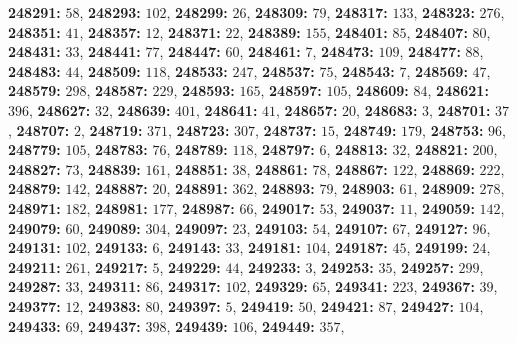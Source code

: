 \textsf{\bfseries 248291:} $58$, \textsf{\bfseries 248293:} $102$, \textsf{\bfseries 248299:} $26$, \textsf{\bfseries 248309:} $79$, \textsf{\bfseries 248317:} $133$, \textsf{\bfseries 248323:} $276$, \textsf{\bfseries 248351:} $41$, \textsf{\bfseries 248357:} $12$, \textsf{\bfseries 248371:} $22$, \textsf{\bfseries 248389:} $155$, \textsf{\bfseries 248401:} $85$, \textsf{\bfseries 248407:} $80$, \textsf{\bfseries 248431:} $33$, \textsf{\bfseries 248441:} $77$, \textsf{\bfseries 248447:} $60$, \textsf{\bfseries 248461:} $7$, \textsf{\bfseries 248473:} $109$, \textsf{\bfseries 248477:} $88$, \textsf{\bfseries 248483:} $44$, \textsf{\bfseries 248509:} $118$, \textsf{\bfseries 248533:} $247$, \textsf{\bfseries 248537:} $75$, \textsf{\bfseries 248543:} $7$, \textsf{\bfseries 248569:} $47$, \textsf{\bfseries 248579:} $298$, \textsf{\bfseries 248587:} $229$, \textsf{\bfseries 248593:} $165$, \textsf{\bfseries 248597:} $105$, \textsf{\bfseries 248609:} $84$, \textsf{\bfseries 248621:} $396$, \textsf{\bfseries 248627:} $32$, \textsf{\bfseries 248639:} $401$, \textsf{\bfseries 248641:} $41$, \textsf{\bfseries 248657:} $20$, \textsf{\bfseries 248683:} $3$, \textsf{\bfseries 248701:} $37$, \textsf{\bfseries 248707:} $2$, \textsf{\bfseries 248719:} $371$, \textsf{\bfseries 248723:} $307$, \textsf{\bfseries 248737:} $15$, \textsf{\bfseries 248749:} $179$, \textsf{\bfseries 248753:} $96$, \textsf{\bfseries 248779:} $105$, \textsf{\bfseries 248783:} $76$, \textsf{\bfseries 248789:} $118$, \textsf{\bfseries 248797:} $6$, \textsf{\bfseries 248813:} $32$, \textsf{\bfseries 248821:} $200$, \textsf{\bfseries 248827:} $73$, \textsf{\bfseries 248839:} $161$, \textsf{\bfseries 248851:} $38$, \textsf{\bfseries 248861:} $78$, \textsf{\bfseries 248867:} $122$, \textsf{\bfseries 248869:} $222$, \textsf{\bfseries 248879:} $142$, \textsf{\bfseries 248887:} $20$, \textsf{\bfseries 248891:} $362$, \textsf{\bfseries 248893:} $79$, \textsf{\bfseries 248903:} $61$, \textsf{\bfseries 248909:} $278$, \textsf{\bfseries 248971:} $182$, \textsf{\bfseries 248981:} $177$, \textsf{\bfseries 248987:} $66$, \textsf{\bfseries 249017:} $53$, \textsf{\bfseries 249037:} $11$, \textsf{\bfseries 249059:} $142$, \textsf{\bfseries 249079:} $60$, \textsf{\bfseries 249089:} $304$, \textsf{\bfseries 249097:} $23$, \textsf{\bfseries 249103:} $54$, \textsf{\bfseries 249107:} $67$, \textsf{\bfseries 249127:} $96$, \textsf{\bfseries 249131:} $102$, \textsf{\bfseries 249133:} $6$, \textsf{\bfseries 249143:} $33$, \textsf{\bfseries 249181:} $104$, \textsf{\bfseries 249187:} $45$, \textsf{\bfseries 249199:} $24$, \textsf{\bfseries 249211:} $261$, \textsf{\bfseries 249217:} $5$, \textsf{\bfseries 249229:} $44$, \textsf{\bfseries 249233:} $3$, \textsf{\bfseries 249253:} $35$, \textsf{\bfseries 249257:} $299$, \textsf{\bfseries 249287:} $33$, \textsf{\bfseries 249311:} $86$, \textsf{\bfseries 249317:} $102$, \textsf{\bfseries 249329:} $65$, \textsf{\bfseries 249341:} $223$, \textsf{\bfseries 249367:} $39$, \textsf{\bfseries 249377:} $12$, \textsf{\bfseries 249383:} $80$, \textsf{\bfseries 249397:} $5$, \textsf{\bfseries 249419:} $50$, \textsf{\bfseries 249421:} $87$, \textsf{\bfseries 249427:} $104$, \textsf{\bfseries 249433:} $69$, \textsf{\bfseries 249437:} $398$, \textsf{\bfseries 249439:} $106$, \textsf{\bfseries 249449:} $357$, 
